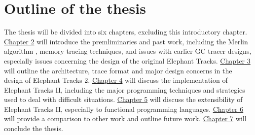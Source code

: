 \section{Outline of the thesis}
The thesis will be divided into six chapters, excluding this introductory chapter. \hyperref[chap:prelim]{Chapter 2} will introduce the premliminaries and
past work, including the Merlin algorithm \citep{Merlin}, memory tracing techniques, and issues with earlier GC tracer designs,
especially issues concerning the design of the original Elephant Tracks. \hyperref[chap:arch]{Chapter 3} will outline the architecture, trace format and
major design concerns in the design of Elephant Tracks 2. \hyperref[chap:algoimp]{Chapter 4} will discuss the implementation of Elephant Tracks II, including
the major programming techniques and strategies used to deal with difficult situations. \hyperref[chap:extensible]{Chapter 5} will discuss the extensibility of
Elephant Tracks II, especially to functional programming languages. \hyperref[chap:conclusion]{Chapter 6} will provide a comparison to other work and outline
future work. \hyperref[chap:realconclusion]{Chapter 7} will conclude the thesis.
